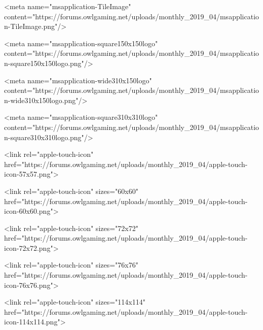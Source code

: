 	

	
		
			<meta name="msapplication-TileImage" content="https://forums.owlgaming.net/uploads/monthly_2019_04/msapplication-TileImage.png"/>
		
	

	
		
			<meta name="msapplication-square150x150logo" content="https://forums.owlgaming.net/uploads/monthly_2019_04/msapplication-square150x150logo.png"/>
		
	

	
		
			<meta name="msapplication-wide310x150logo" content="https://forums.owlgaming.net/uploads/monthly_2019_04/msapplication-wide310x150logo.png"/>
		
	

	
		
			<meta name="msapplication-square310x310logo" content="https://forums.owlgaming.net/uploads/monthly_2019_04/msapplication-square310x310logo.png"/>
		
	

	
		
			
				<link rel="apple-touch-icon" href="https://forums.owlgaming.net/uploads/monthly_2019_04/apple-touch-icon-57x57.png">
			
		
	

	
		
			
				<link rel="apple-touch-icon" sizes="60x60" href="https://forums.owlgaming.net/uploads/monthly_2019_04/apple-touch-icon-60x60.png">
			
		
	

	
		
			
				<link rel="apple-touch-icon" sizes="72x72" href="https://forums.owlgaming.net/uploads/monthly_2019_04/apple-touch-icon-72x72.png">
			
		
	

	
		
			
				<link rel="apple-touch-icon" sizes="76x76" href="https://forums.owlgaming.net/uploads/monthly_2019_04/apple-touch-icon-76x76.png">
			
		
	

	
		
			
				<link rel="apple-touch-icon" sizes="114x114" href="https://forums.owlgaming.net/uploads/monthly_2019_04/apple-touch-icon-114x114.png">
			
